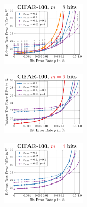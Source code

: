 \begin{figure}[t]
	\begin{subfigure}{0.26\textwidth}
		\includegraphics[height=3.1cm]{c100_summary_8bit.pdf}
	\end{subfigure}
	\begin{subfigure}{0.24\textwidth}
		\includegraphics[height=3.1cm]{c100_summary_6bit.pdf}
	\end{subfigure}
	\begin{subfigure}{0.24\textwidth}
		\includegraphics[height=3.1cm]{c100_summary_4bit.pdf} 
	\end{subfigure}
	\begin{subfigure}{0.24\textwidth}
	\end{subfigure}
	\\[2px]
	

\end{figure}
